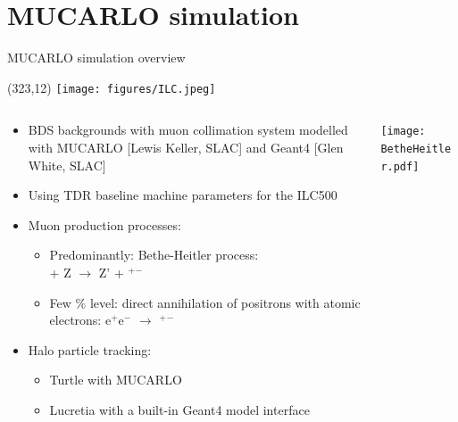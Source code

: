 \documentclass[xcolor={dvipsnames}]{beamer}
\newcommand{\ilclogo}{
  \setlength{\TPHorizModule}{1pt}
  \setlength{\TPVertModule}{1pt}
  \begin{textblock}{1}(323,12)
   \texttt{[image: figures/ILC.jpeg]}
  \end{textblock}
}
\begin{document}
\section{MUCARLO simulation}
\begin{frame}{MUCARLO simulation overview}
\ilclogo

\begin{columns}
 \begin{column}{0.7\textwidth}
  \begin{itemize}
\item BDS backgrounds with muon collimation system modelled with MUCARLO [Lewis Keller, SLAC] and Geant4 [Glen White, SLAC]
\item Using TDR baseline machine parameters for the ILC500
\item Muon production processes:
\begin{itemize}
\item Predominantly: Bethe-Heitler process:\\ \textgamma + Z $\rightarrow$ Z' + \textmu$^+$\textmu$^-$
\item Few \% level: direct annihilation of positrons with atomic electrons: e$^+$e$^-$ $\rightarrow$ \textmu$^+$\textmu$^-$
\end{itemize}
\item Halo particle tracking:
\begin{itemize}
\item Turtle with MUCARLO
\item Lucretia with a built-in Geant4 model interface
\end{itemize}
\end{itemize}

 \end{column}
 \begin{column}{0.3\textwidth}
  \texttt{[image: BetheHeitler.pdf]}
 \end{column}
\end{columns}
\end{frame}
\end{document}
